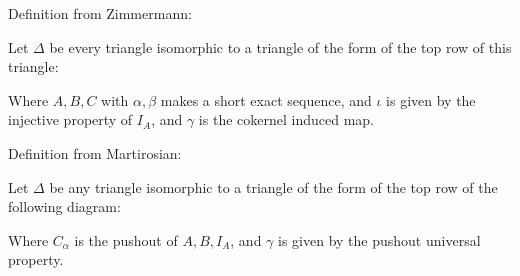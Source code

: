 \begin{definition}
    Definition from Zimmermann:

    Let \( \Delta \) be every triangle isomorphic to a triangle of the form of the top row of this triangle:

    \begin{center}
    \end{center}

    Where \( A, B, C \) with \( \alpha, \beta \) makes a short exact sequence, and \( \iota \) is given by the injective property of \( I_A \), and \( \gamma \) is the cokernel induced map.

    Definition from Martirosian:

    Let \( \Delta \) be any triangle isomorphic to a triangle of the form of the top row of the following diagram:

    \begin{center}
    \end{center}

    Where \( C_\alpha \) is the pushout of \( A, B, I_A \), and \( \gamma \) is given by the pushout universal property.
\end{definition}

